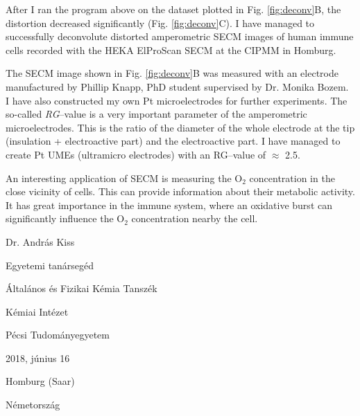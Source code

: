 \documentclass[a4paper, 11pt, oneside, bibliography=totoc]{article}
\begin{document}
After I ran the program above on the dataset plotted in Fig. \ref{fig:deconv}B, the distortion decreased significantly (Fig. \ref{fig:deconv}C). I have managed to successfully deconvolute distorted amperometric SECM images of human immune cells recorded with the HEKA ElProScan SECM at the CIPMM in Homburg.

The SECM image shown in Fig. \ref{fig:deconv}B was measured with an electrode manufactured by Phillip Knapp, PhD student supervised by Dr. Monika Bozem. I have also constructed my own Pt microelectrodes for further experiments. The so-called \emph{RG}--value is a very important parameter of the amperometric microelectrodes. This is the ratio of the diameter of the whole electrode at the tip (insulation + electroactive part) and the electroactive part. I have managed to create Pt UMEs (ultramicro electrodes) with an RG--value of $\approx$ 2.5.

An interesting application of SECM is measuring the O$_2$ concentration in the close vicinity of cells. This can provide information about their metabolic activity. It has great importance in the immune system, where an oxidative burst can significantly influence the O$_2$ concentration nearby the cell. 


Dr. András Kiss

Egyetemi tanársegéd

Általános és Fizikai Kémia Tanszék

Kémiai Intézet

Pécsi Tudományegyetem


2018, június 16

Homburg (Saar)

Németország


{}

\end{document}
